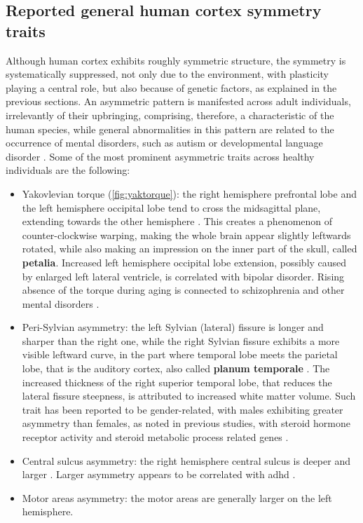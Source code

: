 \subsection{Reported general human cortex symmetry traits}
\label{subsec:general_sym_traits}
Although human cortex exhibits roughly symmetric structure, the symmetry is systematically suppressed, not only due to the environment, with plasticity playing a central role, but also because of genetic factors, as explained in the previous sections. An asymmetric pattern is manifested across adult individuals, irrelevantly of their upbringing, comprising, therefore, a characteristic of the human species, while general abnormalities in this pattern are related to the occurrence of mental disorders, such as autism or developmental language disorder \cite{Herbert2005,Kong2022}. Some of the most prominent asymmetric traits across healthy individuals are the following:
\begin{itemize}
	\item{Yakovlevian torque (\autoref{fig:yaktorque}): the right hemisphere prefrontal lobe and the left hemisphere occipital lobe tend to cross the midsagittal plane, extending towards the other hemisphere \cite{Kuo2022}. This creates a phenomenon of counter-clockwise warping, making the whole brain appear slightly leftwards rotated, while also making an impression on the inner part of the skull, called \textbf{petalia}. Increased left hemisphere occipital lobe extension, possibly caused by enlarged left lateral ventricle, is correlated with bipolar disorder\cite{Maller2015}. Rising absence of the torque during aging is connected to schizophrenia  and other mental disorders \cite{Ribolsi2014}.}
	\item{Peri-Sylvian asymmetry: the left Sylvian (lateral) fissure is longer and sharper than the right one, while the right Sylvian fissure exhibits a more visible leftward curve, in the part where temporal lobe meets the parietal lobe, that is the auditory cortex, also called \textbf{planum temporale} \cite{Kuo2022}. The increased thickness of the right superior temporal lobe, that reduces the lateral fissure steepness, is attributed to increased white matter volume. Such trait has been reported to be gender-related, with males exhibiting greater asymmetry than females, as noted in previous studies, with steroid hormone receptor activity and steroid metabolic process related genes \cite{Guadalupe2015}.}
	\item{Central sulcus asymmetry: the right hemisphere central sulcus is deeper and larger \cite{Kuo2022}. Larger asymmetry appears to be correlated with \ac{adhd} \cite{Li2015}.}
	\item{Motor areas asymmetry: the motor areas are generally larger on the left hemisphere.}
\end{itemize}

